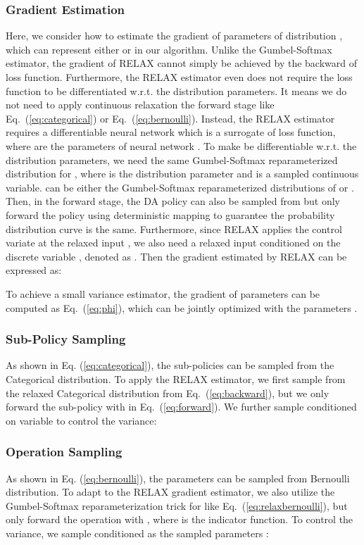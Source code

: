 \documentclass[runningheads]{llncs}
\begin{document}
\subsubsection{Gradient Estimation}
Here, we consider how to estimate the gradient of parameters of distribution , which can represent either  or  in our algorithm.
Unlike the Gumbel-Softmax estimator, the gradient of RELAX  cannot simply be achieved by the backward of loss function. 
Furthermore, the RELAX estimator even does not require the loss function  to be differentiated w.r.t.  the distribution parameters. 
It means we do not need to
apply continuous relaxation the forward stage like Eq.~(\ref{eq:categorical}) or Eq.~(\ref{eq:bernoulli}).
Instead,
the RELAX estimator requires a differentiable neural network  which is a surrogate of loss function, where  are the parameters of neural network .
To make  be differentiable w.r.t. the distribution parameters, we need the same Gumbel-Softmax reparameterized distribution  for , 
where  is the distribution parameter and  is a sampled continuous variable.
 can be either the Gumbel-Softmax reparameterized distributions of  or . Then, in the forward stage, the DA policy can also be sampled from  but only forward the policy using deterministic mapping  to guarantee the probability distribution curve is the  same.
Furthermore, since RELAX applies the
control variate at the relaxed input , we also need a relaxed input conditioned on the discrete variable , denoted as .
Then the gradient estimated by RELAX can be expressed as:

To achieve a small variance estimator,
the gradient of parameters  can be computed as Eq.~(\ref{eq:phi}), which can be jointly optimized with the parameters .


\subsubsection{Sub-Policy Sampling}
As shown in Eq. (\ref{eq:categorical}), the sub-policies can be sampled from the Categorical distribution. To 
apply the RELAX estimator, we first sample  from the relaxed Categorical distribution  from Eq.~(\ref{eq:backward}), but we only forward the sub-policy with  in Eq.~(\ref{eq:forward}).
We further sample  conditioned on variable  to control the variance:


\subsubsection{Operation Sampling}
As shown in Eq. (\ref{eq:bernoulli}), the parameters  can be sampled from Bernoulli distribution. To adapt to the RELAX gradient estimator, we also utilize the Gumbel-Softmax reparameterization trick for   like Eq.~(\ref{eq:relaxbernoulli}), but only forward the operation with , where  is the indicator function. To control the variance, we sample  conditioned as the sampled parameters :
\end{document}
